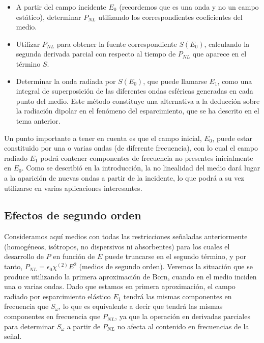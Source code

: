 \documentclass[12pt,a4paper]{report}
\newcommand{\esp}{\vspace{0.5cm}}
\begin{document}
	\begin{itemize}
		\item A partir del campo incidente $E_0$ (recordemos que es una onda y no un campo estático), determinar $P_{NL}$ utilizando los correspondientes coeficientes del medio.
		\item Utilizar $P_{NL}$ para obtener la fuente correspondiente $S(E_0)$, calculando la segunda derivada parcial con respecto al tiempo de $P_{NL}$ que aparece en el término $S$.
		\item Determinar la onda radiada por $S(E_0)$, que puede llamarse $E_1$, como una integral de superposición de las diferentes ondas esféricas generadas en cada punto del medio. Este método constituye una alternativa a la deducción sobre la radiación dipolar en el fenómeno del esparcimiento, que se ha descrito en el tema anterior.
	\end{itemize}
	
	\esp
	
	Un punto importante a tener en cuenta es que el campo inicial, $E_0$, puede estar constituido por una o varias ondas (de diferente frecuencia), con lo cual el campo radiado $E_1$ podrá contener componentes de frecuencia no presentes inicialmente en $E_0$. Como se describió en la introducción, la no linealidad del medio dará lugar a la aparición de nuevas ondas a partir de la incidente, lo que podrá a su vez utilizarse en varias aplicaciones interesantes.
	
	\subsection{Efectos de segundo orden}
	
	Consideramos aquí medios con todas las restricciones señaladas anteriormente (homogéneos, isótropos, no dispersivos ni absorbentes) para los cuales el desarrollo de $P$ en función de $E$ puede truncarse en el segundo término, y por tanto, $P_{NL} = \epsilon_0 \chi^{(2)} E^2$ (medios de segundo orden). Veremos la situación que se produce utilizando la primera aproximación de Born, cuando en el medio inciden una o varias ondas. Dado que estamos en primera aproximación, el campo radiado por esparcimiento elástico $E_1$ tendrá las mismas componentes en frecuencia que $S_\omega$, lo que es equivalente a decir que tendrá las mismas componentes en frecuencia que $P_{NL}$, ya que la operación en derivadas parciales para determinar $S_\omega$ a partir de $P_{NL}$ no afecta al contenido en frecuencias de la señal.
	
\end{document}

